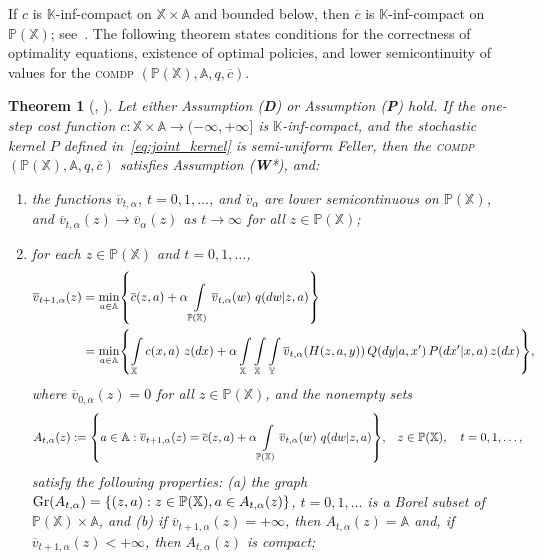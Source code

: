 \documentclass[11pt,onecolumn]{IEEEtran}  %
\newcommand{\Ab}{\mathbb{A}}
\newcommand{\Kb}{\mathbb{K}}
\newcommand{\Pb}{\mathbb{P}}
\newcommand{\Xb}{\mathbb{X}}
\newcommand{\Yb}{\mathbb{Y}}
\renewcommand{\bar}{\overline}
\newcommand{\defeq}{:=}%
\newcommand{\comdp}{\textsc{comdp}}
\DeclareMathOperator{\Gr}{\mathrm{Gr}}
\DeclarePairedDelimiter{\set}{\{}{\}}
\newtheorem{theorem}{Theorem}
\theoremstyle{definition}
\begin{document}
If $c$ is $\Kb$-inf-compact on $\Xb \times \Ab$ and bounded below, then $\bar c$ is $\Kb$-inf-compact on $\Pb(\Xb)$; see~\citet[Theorem 3.4]{feinberg_partially_2016}. The following theorem states conditions for the correctness of optimality equations, existence of optimal policies, and lower semicontinuity of values for the \comdp{} $(\Pb(\Xb), \Ab, q, \bar c)$.

\begin{theorem}[{\citet[Theorem 2]{feinberg_average_cost_2012}, \cite[Theorem 3.1]{feinberg_partially_2016}}] \label{thm:comdp_results}
    Let either Assumption (\textbf{D}) or Assumption (\textbf{P}) hold. If the one-step cost function $c : \Xb \times \Ab \to (-\infty, +\infty]$ is $\Kb$-inf-compact, and the stochastic kernel $P$ defined in~\eqref{eq:joint_kernel} is semi-uniform Feller, then the \comdp{} $(\Pb(\Xb), \Ab, q, \bar c)$ satisfies Assumption (\textbf{W}*), and:
    \begin{enumerate}
        \item the functions $\bar v_{t,\alpha}$, $t=0,1,\dots$, and $\bar v_{\alpha}$ are lower semicontinuous on $\Pb(\Xb)$, and $\bar v_{t,\alpha}(z) \to \bar v_{\alpha}(z)$ as $t \to \infty$ for all $z \in \Pb(\Xb)$;
        \item for each $z \in \Pb(\Xb)$ and $t=0,1,\dots$,
        \begin{align*}
            \bar v_{t+1,\alpha}(z) &=
            \min_{a \in \Ab} \set*{
                \bar c (z,a) + \alpha \int\limits_{\Pb(\Xb)} \bar v_{t,\alpha}(w) \ q(dw|z,a)
            } \\ &=
            \min_{a \in \Ab} \set*{
                \int\limits_{\Xb} c(x,a) \ z(dx) + \alpha
                \int\limits_{\Xb}\int\limits_{\Xb} \int\limits_{\Yb} \bar v_{t,\alpha}( H(z,a,y)) \, Q(dy|a,x') \, P(dx'|x,a) \, z(dx)
            },
        \end{align*}
        where $\bar v_{0,\alpha}(z) = 0$ for all $z \in \Pb(\Xb)$, and the nonempty sets
        \begin{align*}
            A_{t,\alpha}(z) &\defeq \set*{
                a \in \Ab : \bar v_{t+1,\alpha}(z) = \bar c(z,a) + \alpha \int\limits_{\Pb(\Xb)} \bar v_{t,\alpha}(w) \ q(dw|z,a)
            },  &&
            z \in \Pb(\Xb), \quad
            t=0,1,\dots,
        \end{align*}
        satisfy the following properties: (a) the graph $\Gr(A_{t,\alpha}) = \set{(z,a) : z \in \Pb(\Xb), a \in A_{t,\alpha}(z)}$, $t=0,1,\dots$ is a Borel subset of $\Pb(\Xb) \times \Ab$, and (b) if $\bar v_{t+1,\alpha}(z) = +\infty$, then $A_{t,\alpha}(z) = \Ab$ and, if $\bar v_{t+1,\alpha}(z) < +\infty$, then $A_{t,\alpha}(z)$ is compact;

\end{enumerate}
\end{theorem}
\end{document}
